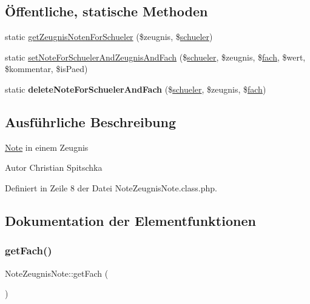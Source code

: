 \subsection*{Öffentliche, statische Methoden}
\begin{DoxyCompactItemize}
\item 
static \mbox{\hyperlink{class_note_zeugnis_note_af893cb280aafb2ea282d485810d3ad9c}{get\+Zeugnis\+Noten\+For\+Schueler}} (\$zeugnis, \$\mbox{\hyperlink{classschueler}{schueler}})
\item 
static \mbox{\hyperlink{class_note_zeugnis_note_aa5e80cf89cfbf5a9ed535940ad54b262}{set\+Note\+For\+Schueler\+And\+Zeugnis\+And\+Fach}} (\$\mbox{\hyperlink{classschueler}{schueler}}, \$zeugnis, \$\mbox{\hyperlink{classfach}{fach}}, \$wert, \$kommentar, \$is\+Paed)
\item 
\mbox{\label{class_note_zeugnis_note_ad631576b763c74f5fa4d4a757822cd59}} 
static {\bfseries delete\+Note\+For\+Schueler\+And\+Fach} (\$\mbox{\hyperlink{classschueler}{schueler}}, \$zeugnis, \$\mbox{\hyperlink{classfach}{fach}})
\end{DoxyCompactItemize}


\subsection{Ausführliche Beschreibung}
\mbox{\hyperlink{class_note}{Note}} in einem Zeugnis \begin{DoxyAuthor}{Autor}
Christian Spitschka 
\end{DoxyAuthor}


Definiert in Zeile 8 der Datei Note\+Zeugnis\+Note.\+class.\+php.



\subsection{Dokumentation der Elementfunktionen}
\mbox{\label{class_note_zeugnis_note_a5f11dcc708bb247aeb22fb8e0d2cc390}} 
\subsubsection{\texorpdfstring{get\+Fach()}{getFach()}}
{\footnotesize\ttfamily Note\+Zeugnis\+Note\+::get\+Fach (\begin{DoxyParamCaption}{ }\end{DoxyParamCaption})}


